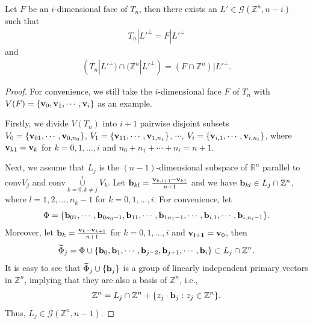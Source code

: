 \documentclass[10pt,a4paper]{amsart}
\begin{document}
\begin{lemma}\label{lem:projTnZnFn}
    Let $F$ be an $i$-dimensional face of $T_n$, then there exists an $L'\in\mathcal{G}(\mathbb{Z}^n,n-i)$ such that
    \begin{align*}
       T_n|L'^\perp=F|L'^\perp
    \end{align*}
    and
    \begin{align*}
       (T_n|L'^\perp)\cap(\mathbb{Z}^n|L'^\perp)=(F\cap\mathbb{Z}^n)|L'^\perp. 
    \end{align*}
\end{lemma}

\begin{proof}
    For convenience, we still take the $i$-dimensional face $F$ of $T_n$ with $V(F)=\{{\bf v}_0,{\bf v}_1,\cdots,{\bf v}_i\}$ as an example.

Firstly, we divide $V(T_n)$ into $i+1$ pairwise disjoint subsets $V_0=\{{\bf v}_{01},\cdots,{\bf v}_{0,n_0}\}$, $V_1=\{{\bf v}_{11},\cdots,{\bf v}_{1,n_1}\}$, $\cdots$, $V_i=\{{\bf v}_{i,1},\cdots,{\bf v}_{i,n_i}\}$, where ${\bf v}_{k1}={\bf v}_k$ for $k=0,1,...,i$ and $n_0+n_1+\cdots+n_i=n+1$.


Next, we assume that $L_j$ is the $(n-1)$-dimensional subspace of $\mathbb{R}^n$ parallel to conv$V_j$ and conv$\underset{k=0,k\not=j}{\overset{i}{\cup}}V_k$. Let ${\bf b}_{kl}=\frac{{\bf v}_{k,l+1}-{\bf v}_{k1}}{n+1}$ and we have ${\bf b}_{kl}\in L_j\cap\mathbb{Z}^n$, where $l=1,2,...,n_k-1$ for $k=0,1,...,i$. For convenience, let $$\Phi=\{{\bf b}_{01},\cdots,{\bf b}_{0n_0-1},{\bf b}_{11},\cdots,{\bf b}_{1n_1-1},\cdots,{\bf b}_{i,1},\cdots,{\bf b}_{i,n_i-1}\}.$$
Moreover, let ${\bf b}_k=\frac{{\bf v}_k-{\bf v}_{k+1}}{n+1}$ for $k=0,1,...,i$ and ${\bf v_{i+1}}={\bf v}_0$, then
$$\widetilde{\Phi}_j=\Phi\cup\{{\bf b}_0,{\bf b}_1,\cdots,{\bf b}_{j-2},{\bf b}_{j+1},\cdots,{\bf b}_i\}\subset L_j\cap\mathbb{Z}^n.$$
It is easy to see that $\widetilde{\Phi}_j\cup\{{\bf b}_j\}$ is a group of linearly independent primary vectors in $\mathbb{Z}^n$, implying that they are also a basis of $\mathbb{Z}^n$, i.e.,
$$\mathbb{Z}^n=L_j\cap\mathbb{Z}^n+\{z_j\cdot{\bf b}_j:z_j\in\mathbb{Z}^n\}.$$
Thus, $L_j\in\mathcal{G}(\mathbb{Z}^n,n-1)$.


\end{proof}
\end{document}
